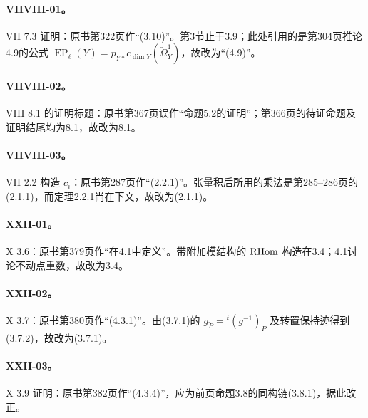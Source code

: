 \paragraph*{VIIVIII-01。}

VII 7.3 证明：原书第322页作“(3.10)”。第3节止于3.9；此处引用的是第304页推论4.9的公式 $\operatorname{EP}_\ell(Y)=p_{Y*}c_{\dim Y}(\check\Omega_Y^1)$，故改为“(4.9)”。

\hypertarget{collation-VIIVIII-02}{}

\paragraph*{VIIVIII-02。}

VIII 8.1 的证明标题：原书第367页误作“命题5.2的证明”；第366页的待证命题及证明结尾均为8.1，故改为8.1。

\hypertarget{collation-VIIVIII-03}{}

\paragraph*{VIIVIII-03。}

VII 2.2 构造 $c_i$：原书第287页作“(2.2.1)”。张量积后所用的乘法是第285--286页的(2.1.1)，而定理2.2.1尚在下文，故改为(2.1.1)。

\hypertarget{collation-XXII-01}{}

\paragraph*{XXII-01。}

X 3.6：原书第379页作“在4.1中定义”。带附加模结构的 $\mathrm{RHom}$ 构造在3.4；4.1讨论不动点重数，故改为3.4。

\hypertarget{collation-XXII-02}{}

\paragraph*{XXII-02。}

X 3.7：原书第380页作“(4.3.1)”。由(3.7.1)的 $g_{\check P}={}^t(g^{-1})_P$ 及转置保持迹得到(3.7.2)，故改为(3.7.1)。

\hypertarget{collation-XXII-03}{}

\paragraph*{XXII-03。}

X 3.9 证明：原书第382页作“(4.3.4)”，应为前页命题3.8的同构链(3.8.1)，据此改正。

